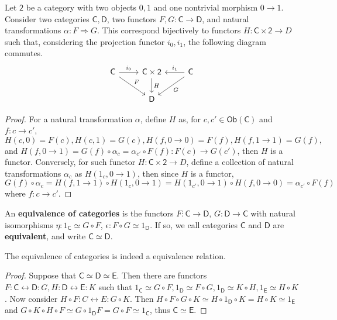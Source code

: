 \begin{lemma} Let $\mathsf{2}$ be a category with two objects $0,1$ and one nontrivial morphism $0\rightarrow 1$. Consider two categories $\mathsf{C},\mathsf{D}$, two functors $F,G:\mathsf{C}\rightarrow \mathsf{D}$, and natural transformations $\alpha:F\Rightarrow G$. This correspond bijectively to functors $H:\mathsf{C}\times \mathsf{2}\rightarrow D$ such that, considering the projection functor $i_0,i_1$, the following diagram commutes.
\begin{equation}
\begin{tikzcd}
\mathsf{C}\arrow{r}{i_0} \arrow{rd}{F} & \mathsf{C}\times\mathsf{2}\arrow{d}{H} & \mathsf{C}\arrow[swap]{l}{i_1} \arrow{ld}{G}\\
&\mathsf{D}&
\end{tikzcd}
\end{equation}
\end{lemma}
\begin{proof}
For a natural transformation $\alpha$, define $H$ as, for $c,c'\in\mathsf{Ob}(\mathsf{C})$ and $f:c\rightarrow c'$, $H(c,0)=F(c), H(c,1)=G(c), H(f,0\rightarrow 0)=F(f), H(f,1\rightarrow 1)=G(f),$ and $H(f,0\rightarrow 1)=G(f)\circ\alpha_c=\alpha_{c'}\circ F(f):F(c)\rightarrow G(c')$, then $H$ is a functor. Conversely, for such functor $H:\mathsf{C}\times \mathsf{2}\rightarrow D$, define a collection of natural transformations $\alpha_c$ as $H(1_c,0\rightarrow 1)$, then since $H$ is a functor, $G(f)\circ \alpha_c=H(f,1\rightarrow 1)\circ H(1_c,0\rightarrow 1)=H(1_{c'},0\rightarrow 1)\circ H(f,0\rightarrow 0)=\alpha_{c'}\circ F(f)$ where $f:c\rightarrow c'$.
\end{proof}

\begin{defn} An \textbf{equivalence of categories} is the functors $F:\mathsf{C}\rightarrow \mathsf{D}$, $G:\mathsf{D}\rightarrow \mathsf{C}$ with natural isomorphisms $\eta:1_\mathsf{C}\simeq G\circ F$, $\epsilon:F\circ G\simeq 1_\mathsf{D}$. If so, we call categories $\mathsf{C}$ and $\mathsf{D}$ are \textbf{equivalent}, and write $\mathsf{C}\simeq \mathsf{D}$.
\end{defn}

\begin{prop} The equivalence of categories is indeed a equivalence relation.
\end{prop}
\begin{proof} Suppose that $\mathsf{C}\simeq \mathsf{D}\simeq \mathsf{E}$. Then there are functors $F:\mathsf{C}\leftrightarrow \mathsf{D}:G, H:\mathsf{D}\leftrightarrow \mathsf{E}:K$ such that $1_\mathsf{C}\simeq G\circ F, 1_\mathsf{D}\simeq F\circ G, 1_\mathsf{D}\simeq K\circ H, 1_\mathsf{E}\simeq H\circ K$. Now consider $H\circ F:C\leftrightarrow E:G\circ K$. Then $H\circ F\circ G\circ K\simeq H\circ 1_\mathsf{D}\circ K=H\circ K\simeq 1_\mathsf{E}$ and $G\circ K\circ H\circ F\simeq G\circ 1_\mathsf{D} F=G\circ F\simeq 1_\mathsf{C}$, thus $\mathsf{C}\simeq \mathsf{E}$.
\end{proof}

